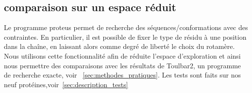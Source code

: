     \clearpage

   \subsection{comparaison sur un espace réduit}
 
Le programme proteus permet de recherche des séquences/conformations avec des contraintes. En particulier, il est possible de fixer le type de résidu à une position dans la chaîne, en laissant alors comme degré de liberté le choix du rotamère. Nous utilisons cette fonctionnalité afin de réduite l'espace d'exploration et ainsi nous permettre des comparaisons avec les résultats de Toulbar2, un programme de recherche exacte, voir ~\ref{sec:methodes_pratiques}. Les tests sont faits sur nos neuf protéines,voir~\ref{sec:description_tests}

